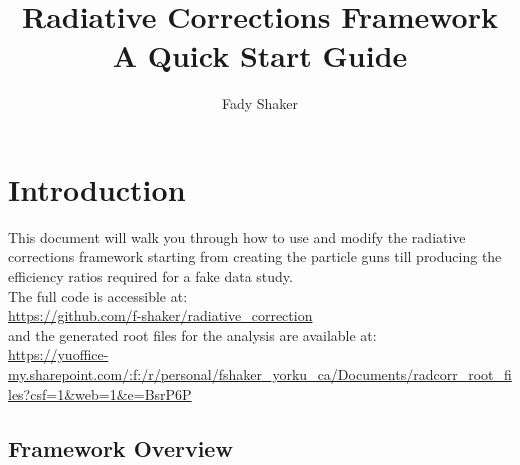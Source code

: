 \documentclass[12pt]{article}
\title{Radiative Corrections Framework\\ A Quick Start Guide}
\author{Fady Shaker}
\begin{document}
\maketitle
\tableofcontents
\newpage
\section{Introduction}
This document will walk you through how to use and modify the radiative corrections framework starting from creating the particle guns till producing the efficiency ratios required for a fake data study.\\

The full code is accessible at:\\
\url{https://github.com/f-shaker/radiative_correction}\\
and the generated root files for the analysis are available at:\\
\url{https://yuoffice-my.sharepoint.com/:f:/r/personal/fshaker_yorku_ca/Documents/radcorr_root_files?csf=1&web=1&e=BsrP6P}

\subsection{Framework Overview}
\begin{figure}[!ht]
\end{figure}
\end{document}
